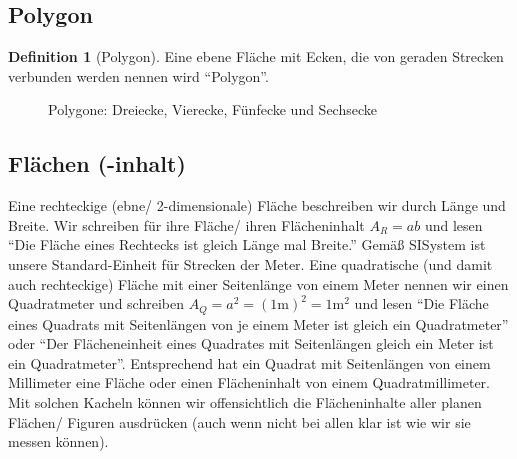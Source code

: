 \documentclass[a4paper]{book}%
\theoremstyle{definition}
\newtheorem{definition}{Definition}
\begin{document}
\subsection{Polygon}\label{Polygon}

\begin{definition}[Polygon]
    Eine ebene Fläche mit Ecken, die von geraden Strecken verbunden werden nennen wird \enquote{Polygon}.
\end{definition}

\begin{figure}
  \centering
  \caption{Polygone: Dreiecke, Vierecke, Fünfecke und Sechsecke}\label{fig:Polygone}
\end{figure}



\subsection{Flächen (-inhalt)}

Eine rechteckige (ebne/ 2-dimensionale) Fläche beschreiben wir durch Länge und Breite. Wir schreiben für ihre Fläche/ ihren Flächeninhalt $A_R = a b$ und lesen \enquote{Die Fläche eines Rechtecks ist gleich Länge mal Breite.} Gemäß \gls{SISystem} ist unsere Standard-Einheit für Strecken der Meter. Eine quadratische (und damit auch rechteckige) Fläche mit einer Seitenlänge von einem Meter nennen wir einen Quadratmeter und schreiben $A_Q = a^2 = (1\text{m})^2 = 1\text{m}^2$ und lesen \enquote{Die Fläche eines Quadrats mit Seitenlängen von je einem Meter ist gleich ein Quadratmeter} oder \enquote{Der Flächeneinheit eines Quadrates mit Seitenlängen gleich ein Meter ist ein Quadratmeter}. Entsprechend hat ein Quadrat mit Seitenlängen von einem Millimeter eine Fläche oder einen Flächeninhalt von einem Quadratmillimeter. Mit solchen Kacheln können wir offensichtlich die Flächeninhalte aller planen Flächen/ Figuren ausdrücken (auch wenn nicht bei allen klar ist wie wir sie messen können).
\end{document}

